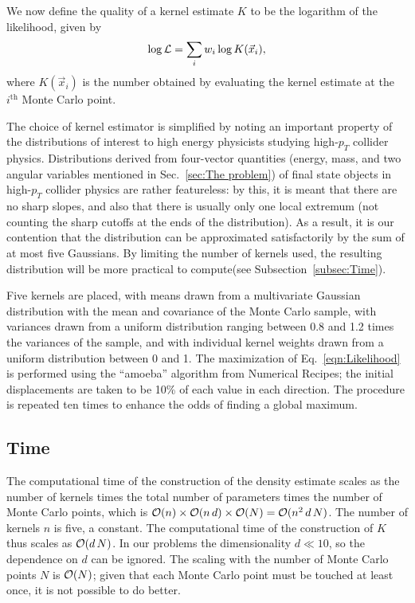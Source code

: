 \documentclass[prd,twocolumn]{revtex4}
\def\nMC{N}
\begin{document}
We now define the quality of a kernel estimate $K$ to be the logarithm of the likelihood, given by
\begin{equation}
\label{eqn:Likelihood}
\log {\cal L} = \sum_i{w_i \log K(\vec{x}_i)},
\end{equation}
where $K(\vec{x}_i)$ is the number obtained by evaluating the kernel estimate at the $i^{\text{th}}$ Monte Carlo point.

The choice of kernel estimator is simplified by noting an important property of the distributions of interest to high energy physicists studying high-$p_T$ collider physics.  Distributions derived from four-vector quantities (energy, mass, and two angular variables mentioned in Sec.~\ref{sec:The problem}) of final state objects in high-$p_T$ collider physics are rather featureless: by this, it is meant that there are no sharp slopes, and also that there is usually only one local extremum (not counting the sharp cutoffs at the ends of the distribution).  As a result, it is our contention that the distribution can be approximated satisfactorily by the sum of at most five Gaussians.  By limiting the number of kernels used, the resulting distribution will be more practical to compute(see Subsection~\ref{subsec:Time}).  

Five kernels are placed, with means drawn from a multivariate Gaussian distribution with the mean and covariance of the Monte Carlo sample, with variances drawn from a uniform distribution ranging between 0.8 and 1.2 times the variances of the sample, and with individual kernel weights drawn from a uniform distribution between 0 and 1.  The maximization of Eq.~\ref{eqn:Likelihood} is performed using the ``amoeba'' algorithm from Numerical Recipes; the initial displacements are taken to be 10\% of each value in each direction.  The procedure is repeated ten times to enhance the odds of finding a global maximum.

\subsection{Time}

The computational time of the construction of the density estimate scales as the number of kernels times the total number of parameters times the number of Monte Carlo points, which is ${\cal O}(n) \times {\cal O}(n \, d) \times {\cal O}(\nMC) = {\cal O}({n}^2 \, d \, \nMC)$.  The number of kernels $n$ is five, a constant.  The computational time of the construction of $K$ thus scales as ${\cal O}(d \, \nMC)$.  In our problems the dimensionality $d \ll 10$, so the dependence on $d$ can be ignored.  The scaling with the number of Monte Carlo points $\nMC$ is ${\cal O}(\nMC)$; given that each Monte Carlo point must be touched at least once, it is not possible to do better.
\end{document}
